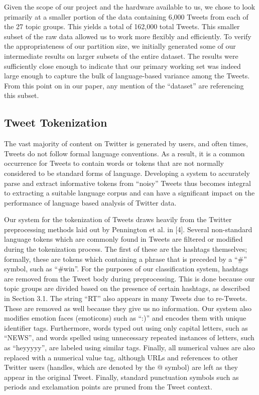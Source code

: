 \documentclass[11pt]{article}
\begin{document}
Given the scope of our project and the hardware available to us, we chose to look primarily at a smaller portion of the data containing 6,000 Tweets from each of the 27 topic groups. This yields a total of 162,000 total Tweets. This smaller subset of the raw data allowed us to work more flexibly and efficiently. To verify the appropriateness of our partition size, we initially generated some of our intermediate results on larger subsets of the entire dataset. The results were sufficiently close enough to indicate that our primary working set was indeed large enough to capture the bulk of language-based variance among the Tweets. From this point on in our paper, any mention of the ``dataset'' are referencing this subset.

\subsection{Tweet Tokenization}
The vast majority of content on Twitter is generated by users, and often times, Tweets do not follow formal language conventions. As a result, it is a common occurrence for Tweets to contain words or tokens that are not normally considered to be standard forms of language. Developing a system to accurately parse and extract informative tokens from ``noisy'' Tweets thus becomes integral to extracting a suitable language corpus and can have a significant impact on the performance of language based analysis of Twitter data.

Our system for the tokenization of Tweets draws heavily from the Twitter preprocessing methods laid out by Pennington et al. in [4]. Several non-standard language tokens which are commonly found in Tweets are filtered or modified during the tokenization process. The first of these are the hashtags themselves; formally, these are tokens which containing a phrase that is preceded by a ``\#'' symbol, such as ``\#win''. For the purposes of our classification system, hashtags are removed from the Tweet body during preprocessing. This is done because our topic groups are divided based on the presence of certain hashtags, as described in Section 3.1. The string ``RT'' also appears in many Tweets due to re-Tweets. These are removed as well because they give us no information. Our system also modifies emotion faces (emoticons) such as ``:)'' and encodes them with unique identifier tags. Furthermore, words typed out using only capital letters, such as ``NEWS'', and words spelled using unnecessary repeated instances of letters, such as ``heyyyyy'', are labeled using similar tags. Finally, all numerical values are also replaced with a numerical value tag, although URLs and references to other Twitter users (handles, which are denoted by the @ symbol) are left as they appear in the original Tweet. Finally, standard punctuation symbols such as periods and exclamation points are pruned from the Tweet context.
\end{document}
